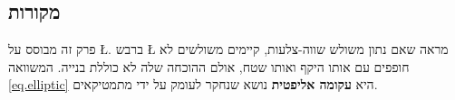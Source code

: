 \vspace{-4ex}

\subsection*{מקורות}

פרק זה מבוסס על 
\L{\cite{mccallum}}.
ברבש
\L{\cite{marita}}
מראה שאם נתון משולש שווה-צלעות, קיימים משולשים לא חופפים עם אותו היקף ואותו שטח, אולם ההוכחה שלה לא כוללת בנייה. 
המשוואה~%
\ref{eq.elliptic}
היא
\textbf{עקומה אליפטית}
נושא שנחקר לעומק על ידי מתמטיקאים.
